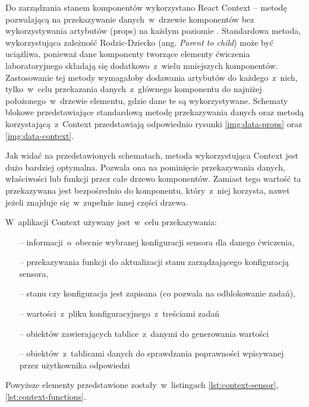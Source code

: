 Do zarządzania stanem komponentów wykorzystano React Context -- metodę pozwalającą na przekazywanie
danych~w~drzewie komponentów bez wykorzystywania artybutów (props) na każdym poziomie
\cite{react-docs}. Standardowa metoda, wykorzystująca zależność Rodzic-Dziecko (ang. \textit{Parent
  to child}) może być uciążliwa, ponieważ dane komponenty tworzące elementy ćwiczenia laboratoryjnego
składają się dodatkowo~z~wielu mniejszych komponentów. Zastosowanie tej metody wymagałoby dodawania
artybutów do każdego~z~nich, tylko~w~celu przekazania danych~z~głównego komponentu do najniżej
położonego~w~drzewie elementu, gdzie dane te są wykorzystywane. Schematy blokowe przedstawiające
standardową metodę przekazywania danych oraz metodą korzystającą~z~Context przedstawiają odpowiednio
rysunki \ref{img:data-props} oraz \ref{img:data-context}.



Jak widać na przedstawionych schematach, metoda wykorzystująca Context jest dużo bardziej optymalna.
Pozwala ona na pominięcie przekazywania danych, właściwości lub funkcji przez całe drzewo
komponentów. Zamiast tego wartość ta przekazywana jest bezpośrednio do komponentu, który~z~niej
korzysta, nawet jeżeli znajduje się~w~zupełnie innej części drzewa.

W~aplikacji Context używany jest~w~celu przekazywania:
\begin{itemize}
  \item[--] informacji~o~obecnie wybranej konfiguracji sensora dla danego ćwiczenia,
  \item[--] przekazywania funkcji do aktualizacji stanu zarządzającego konfiguracją sensora,
  \item[--] stanu czy konfiguracja jest zapisana (co pozwala na odblokowanie zadań),
  \item[--] wartości~z~pliku konfiguracyjnego~z~treściami zadań
  \item[--] obiektów zawierających tablice~z~danymi do generowania wartości
  \item[--] obiektów~z~tablicami danych do sprawdzania poprawności wpisywanej przez użytkownika
        odpowiedzi
\end{itemize}
Powyższe elementy przedstawione zostały~w~listingach \ref{lst:context-sensor},
\ref{lst:context-functions}.


